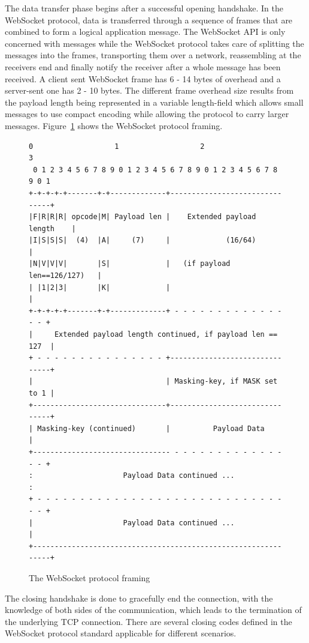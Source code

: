 \noindent
The data transfer phase begins after a successful opening handshake. In the WebSocket protocol, data is transferred through a sequence of frames that are combined to form a logical application message. The WebSocket API is only concerned with messages while the WebSocket protocol takes care of splitting the messages into the frames, transporting them over a network, reassembling at the receivers end and finally notify the receiver after a whole message has been received. A client sent WebSocket frame has 6 - 14 bytes of overhead and a server-sent one has 2 - 10 bytes. The different frame overhead size results from the payload length being represented in a variable length-field which allows small messages to use compact encoding while allowing the protocol to carry larger messages. Figure~\ref{protocol-framing} shows the WebSocket protocol framing.
\\
\begin{figure}[h!]
\begin{Verbatim}[fontsize=\small]
 0                   1                   2                   3
 0 1 2 3 4 5 6 7 8 9 0 1 2 3 4 5 6 7 8 9 0 1 2 3 4 5 6 7 8 9 0 1
+-+-+-+-+-------+-+-------------+-------------------------------+
|F|R|R|R| opcode|M| Payload len |    Extended payload length    |
|I|S|S|S|  (4)  |A|     (7)     |             (16/64)           |
|N|V|V|V|       |S|             |   (if payload len==126/127)   |
| |1|2|3|       |K|             |                               |
+-+-+-+-+-------+-+-------------+ - - - - - - - - - - - - - - - +
|     Extended payload length continued, if payload len == 127  |
+ - - - - - - - - - - - - - - - +-------------------------------+
|                               | Masking-key, if MASK set to 1 |
+-------------------------------+-------------------------------+
| Masking-key (continued)       |          Payload Data         |
+-------------------------------- - - - - - - - - - - - - - - - +
:                     Payload Data continued ...                :
+ - - - - - - - - - - - - - - - - - - - - - - - - - - - - - - - +
|                     Payload Data continued ...                |
+---------------------------------------------------------------+
\end{Verbatim}
\caption{The WebSocket protocol framing}
\label{protocol-framing}
\end{figure}

\noindent
The closing handshake is done to gracefully end the connection, with the knowledge of both sides of the communication, which leads to the termination of the underlying TCP connection. There are several closing codes defined in the WebSocket protocol standard applicable for different scenarios.

